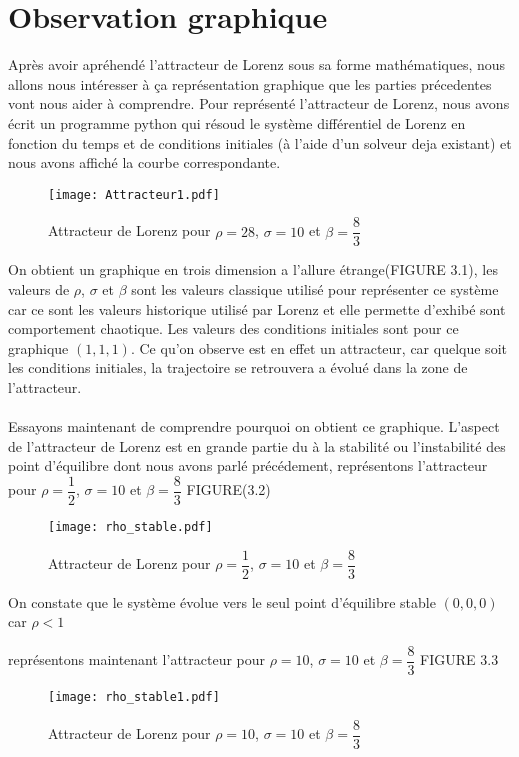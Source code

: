 \section{Observation graphique}
Après avoir apréhendé l'attracteur de Lorenz sous sa forme mathématiques, nous allons nous intéresser à ça représentation graphique que les parties précedentes vont nous aider à comprendre. Pour représenté l'attracteur de Lorenz, nous avons écrit un programme python qui résoud le système différentiel de Lorenz en fonction du temps et de conditions initiales (à l'aide d'un solveur deja existant) et nous avons affiché la courbe correspondante.

\begin{figure}
        \texttt{[image: Attracteur1.pdf]}
        \caption{Attracteur de Lorenz pour $\rho=28$, $\sigma=10$ et $\beta=\dfrac{8}{3}$} 
\end{figure} 

On obtient un graphique en trois dimension a l'allure étrange(FIGURE 3.1), les valeurs de $\rho$, $\sigma$ et $\beta$ sont les valeurs classique utilisé pour représenter ce système car ce sont les valeurs historique utilisé par Lorenz et elle permette d'exhibé sont comportement chaotique. Les valeurs des conditions initiales sont pour ce graphique $(1,1,1)$. Ce qu'on observe est en effet un attracteur, car quelque soit les conditions initiales, la trajectoire se retrouvera a évolué dans la zone de l'attracteur.\\\\
Essayons maintenant de comprendre pourquoi on obtient ce graphique. L'aspect de l'attracteur de Lorenz est en grande partie du à la stabilité ou l'instabilité des point d'équilibre dont nous avons parlé précédement, représentons l'attracteur pour $\rho=\dfrac{1}{2}$, $\sigma=10$ et $\beta=\dfrac{8}{3}$ FIGURE(3.2) 

\begin{figure}
    \texttt{[image: rho\_stable.pdf]}
    \caption{Attracteur de Lorenz pour $\rho=\dfrac{1}{2}$, $\sigma=10$ et $\beta=\dfrac{8}{3}$} 
\end{figure}
On constate que le système évolue vers le seul point d'équilibre stable $(0,0,0)$ car $\rho<1$

représentons maintenant l'attracteur pour $\rho=10$, $\sigma=10$ et $\beta=\dfrac{8}{3}$ FIGURE 3.3

\begin{figure}
    \texttt{[image: rho\_stable1.pdf]}
    \caption{Attracteur de Lorenz pour $\rho=10$, $\sigma=10$ et $\beta=\dfrac{8}{3}$} 
\end{figure}

